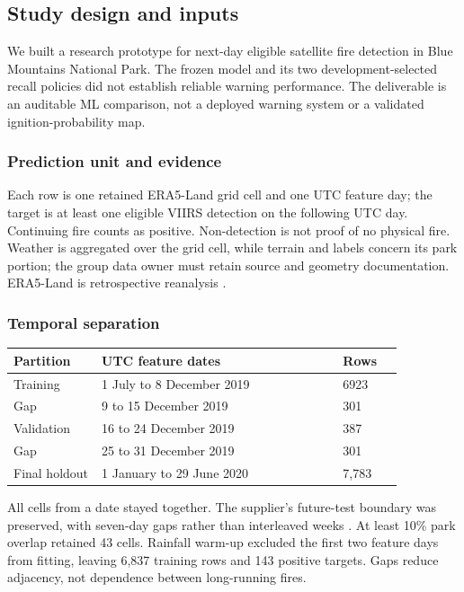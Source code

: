 \subsection{Study design and inputs}

We built a research prototype for next-day eligible satellite fire detection in Blue Mountains National Park. The frozen model and its two development-selected recall policies did not establish reliable warning performance. The deliverable is an auditable ML comparison, not a deployed warning system or a validated ignition-probability map.

\subsubsection*{Prediction unit and evidence}

Each row is one retained ERA5-Land grid cell and one UTC feature day; the target is at least one eligible VIIRS detection on the following UTC day. Continuing fire counts as positive. Non-detection is not proof of no physical fire. Weather is aggregated over the grid cell, while terrain and labels concern its park portion; the group data owner must retain source and geometry documentation. ERA5-Land is retrospective reanalysis \cite{mlERA5Land}.

\subsubsection*{Temporal separation}

\begin{center}\small\setlength{\tabcolsep}{3pt}
\begin{tabular}{p{0.198\linewidth}p{0.525\linewidth}p{0.138\linewidth}}
\hline
Partition & UTC feature dates & Rows \\ \hline
Training & 1 July to 8 December 2019 & 6923 \\
Gap & 9 to 15 December 2019 & 301 \\
Validation & 16 to 24 December 2019 & 387 \\
Gap & 25 to 31 December 2019 & 301 \\
Final holdout & 1 January to 29 June 2020 & 7,783 \\
\hline\end{tabular}\end{center}

All cells from a date stayed together. The supplier's future-test boundary was preserved, with seven-day gaps rather than interleaved weeks \cite{mlTemporalEvaluation}. At least 10\% park overlap retained 43 cells. Rainfall warm-up excluded the first two feature days from fitting, leaving 6,837 training rows and 143 positive targets. Gaps reduce adjacency, not dependence between long-running fires.


